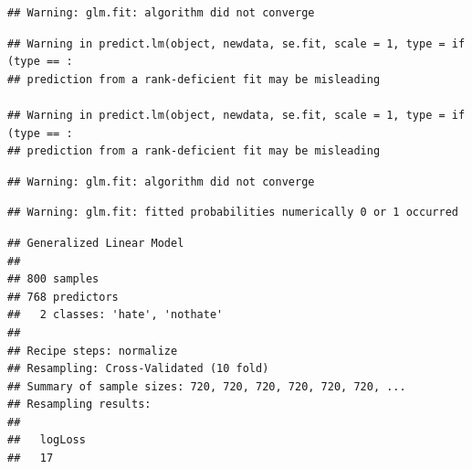 \documentclass[
  english,
  man]{apa6}
\begin{document}
\begin{verbatim}
## Warning: glm.fit: algorithm did not converge
\end{verbatim}

\begin{verbatim}
## Warning in predict.lm(object, newdata, se.fit, scale = 1, type = if (type == :
## prediction from a rank-deficient fit may be misleading

## Warning in predict.lm(object, newdata, se.fit, scale = 1, type = if (type == :
## prediction from a rank-deficient fit may be misleading
\end{verbatim}

\begin{verbatim}
## Warning: glm.fit: algorithm did not converge
\end{verbatim}

\begin{verbatim}
## Warning: glm.fit: fitted probabilities numerically 0 or 1 occurred
\end{verbatim}

\begin{verbatim}
## Generalized Linear Model 
## 
## 800 samples
## 768 predictors
##   2 classes: 'hate', 'nothate' 
## 
## Recipe steps: normalize 
## Resampling: Cross-Validated (10 fold) 
## Summary of sample sizes: 720, 720, 720, 720, 720, 720, ... 
## Resampling results:
## 
##   logLoss
##   17
\end{verbatim}
\end{document}
